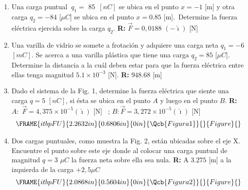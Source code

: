 \documentclass[12pt]{article}
\begin{document}
\begin{enumerate}
\item Una carga puntual $\ q_{1}=$ 85~$[nC]$ se ubica en el punto $x=-1$ [m]
y otra carga $q_{2}=-84$ [$\mu C$] se ubica en el punto $x=0.85$ [m].\
Determine la fuerza el\'{e}ctrica ejercida sobre la carga $q_{2}.$ \textbf{R:%
} $\vec{F}=0,0188$ $(-\hat{\imath})$ [N]

\item Una varilla de vidrio se somete a frotaci\'{o}n y adquiere una carga
neta $q_{1}=-6$ $[mC].$ Se acerca a una varilla pl\'{a}stica que tiene una
carga $q_{2}=85$ [$\mu C$]. Determine la distancia a la cu\'{a}l deben estar
para que la fuerza el\'{e}ctrica entre ellas tenga magnitud $5.1\times
10^{-3}$ [N]. \textbf{R:} $948.68$ [m]

\item Dado el sistema de la Fig. 1, determine la fuerza el\'{e}ctrica que
siente una carga $q=5$ $[nC]$, si \'{e}sta se ubica en el punto $A$ y luego
en el punto $B$. \textbf{R:} $A:$ $\vec{F}=4,375\times 10^{-5}(\hat{\imath})$
[N] \ ; $B:\vec{F}=3,272\times 10^{-5}(\hat{\imath})$ [N] 
\begin{equation*}
\FRAME{itbpFU}{2.2632in}{0.6806in}{0in}{\Qcb{Figura 1}}{}{Figure}{\special%
{language "Scientific Word";type "GRAPHIC";maintain-aspect-ratio
TRUE;display "USEDEF";valid_file "T";width 2.2632in;height 0.6806in;depth
0in;original-width 4.8205in;original-height 1.4313in;cropleft "0";croptop
"1";cropright "1";cropbottom "0";tempfilename
'QYQ9VJ01.wmf';tempfile-properties "XPR";}}
\end{equation*}

\item Dos cargas puntuales, como muestra la Fig. 2, est\'{a}n ubicadas sobre
el eje X. Encuentre el punto sobre este eje donde al colocar una carga
puntual de magnitud $q=3$ $\mu C$ la fuerza neta sobre ella sea nula. 
\textbf{R:} A $3.275$ [m] a la izquierda de la carga $+2,5\mu C$ 
\begin{equation*}
\FRAME{itbpFU}{2.0868in}{0.5604in}{0in}{\Qcb{Figura 2}}{}{Figure}{\special%
{language "Scientific Word";type "GRAPHIC";maintain-aspect-ratio
TRUE;display "USEDEF";valid_file "T";width 2.0868in;height 0.5604in;depth
0in;original-width 4.209in;original-height 1.1113in;cropleft "0";croptop
"1";cropright "1";cropbottom "0";tempfilename
'QYQ9VJ02.wmf';tempfile-properties "XPR";}}
\end{equation*}%
\pagebreak
\end{enumerate}
\end{document}
